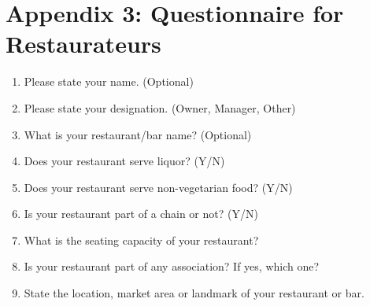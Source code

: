 \documentclass[a4paper, 12pt]{article}
\begin{document}
		\newpage
		\section*{Appendix 3: Questionnaire for Restaurateurs}
		\label {Appendix3}
	
		\begin {enumerate}[nosep]
		\item Please state your name. (Optional)
		\item Please state your designation. (Owner, Manager, Other)
		\item What is your restaurant/bar name? (Optional)
		\item Does your restaurant serve liquor? (Y/N)
		\item Does your restaurant serve non-vegetarian food? (Y/N)
		\item Is your restaurant part of a chain or not? (Y/N)
		\item What is the seating capacity of your restaurant?
		\item Is your restaurant part of any association? If yes, which one?
		\item State the location, market area or landmark of your restaurant or bar.
		\end {enumerate}
		
\end{document}
